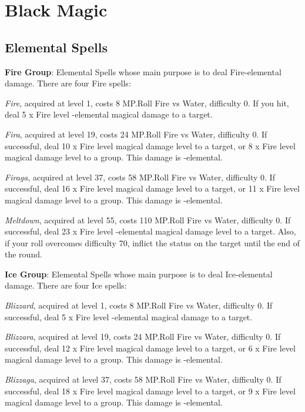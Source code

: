 \section{Black Magic}\label{sec:magic-black}
\begin{multicols}{2}
    \subsection{Elemental Spells}\label{subsec:black-elemental}
    
    \textbf{Fire Group}: Elemental Spells whose main purpose is to deal Fire-elemental damage. There are four Fire spells:

	\textit{Fire}, acquired at level 1, costs 8 MP.\@{}Roll Fire vs Water, difficulty 0. If you hit, deal 5 x Fire level -elemental magical damage to a target.
    
    \textit{Fira}, acquired at level 19, costs 24 MP.\@{}Roll Fire vs Water, difficulty 0. If successful, deal 10 x Fire level magical damage level to a target, or 8 x Fire level magical damage level to a group. This damage is -elemental.
    
    \textit{Firaga}, acquired at level 37, costs 58 MP.\@{}Roll Fire vs Water, difficulty 0. If successful, deal 16 x Fire level magical damage level to a target, or 11 x Fire level magical damage level to a group. This damage is -elemental.
    
    \textit{Meltdown}, acquired at level 55, costs 110 MP.\@{}Roll Fire vs Water, difficulty 0. If successful, deal 23 x Fire level -elemental magical damage level to a target. Also, if your roll overcomes difficulty 70, inflict the  status on the target until the end of the round.
    
    \textbf{Ice Group}: Elemental Spells whose main purpose is to deal Ice-elemental damage. There are four Ice spells:
    
    \textit{Blizzard}, acquired at level 1, costs 8 MP.\@{}Roll Fire vs Water, difficulty 0. If successful, deal 5 x Fire level -elemental magical damage to a target.
    
    \textit{Blizzara}, acquired at level 19, costs 24 MP.\@{}Roll Fire vs Water, difficulty 0. If successful, deal 12 x Fire level magical damage level to a target, or 6 x Fire level magical damage level to a group. This damage is -elemental.
    
    \textit{Blizzaga}, acquired at level 37, costs 58 MP.\@{}Roll Fire vs Water, difficulty 0. If successful, deal 18 x Fire level magical damage level to a target, or 9 x Fire level magical damage level to a group. This damage is -elemental.
    

\end{multicols}
